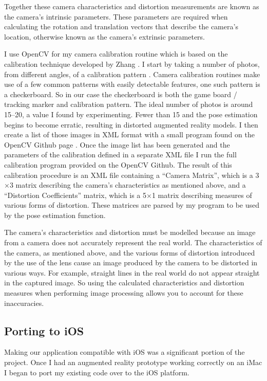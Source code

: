 \documentclass{article}
\begin{document}
Together these camera characteristics and distortion measurements are known as the camera's intrinsic parameters. These parameters are required when calculating the rotation and translation vectors that describe the camera's location, otherwise known as the camera's extrinsic parameters. \par

I use OpenCV for my camera calibration routine which is based on the calibration technique developed by Zhang \cite{zhang}. I start by taking a number of photos, from different angles, of a calibration pattern \cite{calib2}. Camera calibration routines make use of a few common patterns with easily detectable features, one such pattern is a checkerboard. So in our case the checkerboard is both the game board / tracking marker and calibration pattern. The ideal number of photos is around 15--20, a value I found by experimenting. Fewer than 15 and the pose estimation begins to become erratic, resulting in distorted augmented reality models. I then create a list of those images in XML format with a small program found on the OpenCV Github page \cite{opencvGit}. Once the image list has been generated and the parameters of the calibration defined in a separate XML file I run the full calibration program provided on the OpenCV Github. The result of this calibration procedure is an XML file containing a “Camera Matrix”, which is a 3$\times$3 matrix describing the camera's characteristics as mentioned above, and a “Distortion Coefficients” matrix, which is a 5$\times$1 matrix describing measures of various forms of distortion. These matrices are parsed by my program to be used by the pose estimation function. 

The camera's characteristics and distortion must be modelled  because an image from a camera does not accurately represent the real world. The characteristics of the camera, as mentioned above, and the various forms of distortion introduced by the use of the lens cause an image produced by the camera to be distorted in various ways. For example, straight lines in the real world do not appear straight in the captured image. So using the calculated characteristics and distortion measures when performing image processing allows you to account for these inaccuracies.


\subsection{Porting to iOS}

Making our application compatible with iOS was a significant portion of the project. Once I had an augmented reality prototype working correctly on an iMac I began to port my existing code over to the iOS platform. \par
\end{document}
